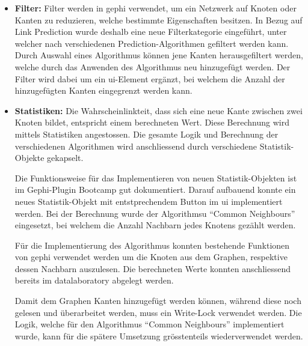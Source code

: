 \begin{itemize}
    \item \textbf{Filter:} Filter werden in \acs{gephi} verwendet, um ein Netzwerk auf Knoten oder Kanten zu reduzieren, welche bestimmte Eigenschaften besitzen.
    In Bezug auf Link Prediction wurde deshalb eine neue Filterkategorie eingeführt, unter welcher nach verschiedenen Prediction-Algorithmen gefiltert werden kann.
    Durch Auswahl eines Algorithmus können jene Kanten herausgefiltert werden, welche durch das Anwenden des Algorithmus neu hinzugefügt werden.
    Der Filter wird dabei um ein \acs{ui}-Element ergänzt, bei welchem die Anzahl der hinzugefügten Kanten eingegrenzt werden kann.

    \item \textbf{Statistiken:} Die Wahrscheinlinkteit, dass sich eine neue Kante zwischen zwei Knoten bildet, entspricht einem berechneten Wert.
    Diese Berechnung wird mittels Statistiken angestossen. Die gesamte Logik und Berechnung der verschiedenen Algorithmen wird anschliessend
    durch verschiedene Statistik-Objekte gekapselt.

    Die Funktionsweise für das Implementieren von neuen Statistik-Objekten ist im Gephi-Plugin Bootcamp gut dokumentiert. Darauf aufbauend
    konnte ein neues Statistik-Objekt mit entstprechendem Button im \acs{ui} implementiert werden. Bei der Berechnung wurde der Algorithmsu
    ``Common Neighbours'' eingesetzt, bei welchem die Anzahl Nachbarn jedes Knotens gezählt werden.

    Für die Implementierung des Algorithmus konnten bestehende Funktionen von \acs{gephi} verwendet werden um die Knoten aus dem Graphen, respektive
    dessen Nachbarn auszulesen. Die berechneten Werte konnten anschliessend bereits im \acs{datalaboratory} abgelegt werden.


    Damit dem Graphen Kanten hinzugefügt werden können, während diese noch gelesen und überarbeitet werden, muss ein Write-Lock
    verwendet werden. Die Logik, welche für den Algorithmus ``Common Neighbours'' implementiert wurde, kann für die spätere Umsetzung
    grösstenteils wiederverwendet werden.
\end{itemize}

